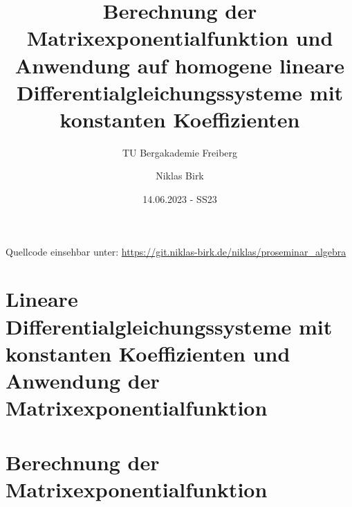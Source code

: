 \documentclass[11pt]{scrartcl}
\title{
    Berechnung der Matrixexponentialfunktion und
    Anwendung auf homogene lineare Differentialgleichungssysteme mit konstanten Koeffizienten
}
\subtitle{TU Bergakademie Freiberg}
\author{Niklas Birk}
\date{14.06.2023 - SS23}
\begin{document}
    \maketitle
    \tableofcontents

    \printbibliography

    \vspace*{\fill}
    Quellcode einsehbar unter: \url{https://git.niklas-birk.de/niklas/proseminar_algebra}

    \newpage

    \section{Lineare Differentialgleichungssysteme mit konstanten Koeffizienten und Anwendung der Matrixexponentialfunktion}\label{sec:dgls-matrixexponential}
    

    \section{Berechnung der Matrixexponentialfunktion}\label{sec:berechnung-matrixexponential}
    
\end{document}
